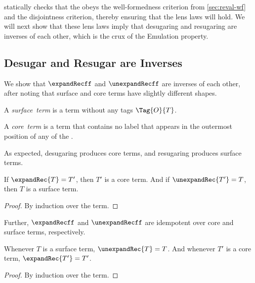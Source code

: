 {\Resugarer} statically checks that the {} obeys the
well-formedness criterion from \cref{sec:reval-wf}
and the disjointness criterion, thereby ensuring
that the lens laws will hold. We will next show that these lens laws imply
that desugaring and resugaring are inverses of each
other, which is the crux of the Emulation property.


\subsection{Desugar and Resugar are Inverses}
\label{sec:reval-inverses}

We show that $\expandRecff$ and $\unexpandRecff$ are inverses of each
other, after noting that surface and core terms have slightly
different shapes.

\begin{definition}
A \emph{surface~term} is a term without any tags $\Tag{O}{T}$.
\end{definition}
\begin{definition}
A \emph{core~term} is a term that contains no label {\lbl} that appears
in the outermost position of any {\LHS} of the {}.
\end{definition}

As expected, desugaring produces core terms, and resugaring produces
surface terms.
\begin{lemma}
If $\expandRec{T} = T'$, then $T'$ is a core term. And
if $\unexpandRec{T'} = T$, then $T$ is a surface term.
\end{lemma}
\begin{proof}
By induction over the term.
\end{proof}
Further, $\expandRecff$ and $\unexpandRecff$ are idempotent over core and surface
terms, respectively.
\begin{lemma}
Whenever $T$ is a surface term, $\unexpandRec{T} = T$.
And whenever $T'$ is a core term, $\expandRec{T'} = T'$.
\end{lemma}
\begin{proof}
By induction over the term.
\end{proof}

